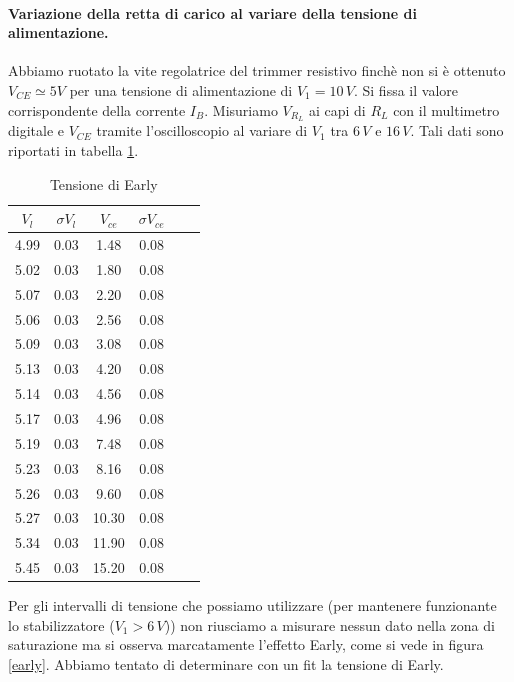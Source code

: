 \documentclass[10pt,a4paper]{article}
\begin{document}
\paragraph{Variazione della retta di carico al variare della tensione di alimentazione.}
 
Abbiamo ruotato la vite regolatrice del trimmer resistivo finchè non si è ottenuto $V_{CE}\simeq 5V$ per una tensione di alimentazione di $V_1 = 10 \, V$. Si fissa il valore corrispondente della corrente $I_B$. Misuriamo  $V_{R_L}$ ai capi di $R_L$ con il multimetro digitale  e $V_{CE}$ tramite l'oscilloscopio al variare di $V_1$ tra $6\,V$ e $16\,V$. Tali dati sono riportati in tabella \ref{dati2}.

\begin{table}[!htb]\centering
\begin{tabular}{|c|c|c|c|c|c|}
\hline
$V_l$ & $\sigma V_l$ & $V_{ce}$ & $\sigma V_{ce}$\\
\hline
4.99 & 0.03 & 1.48 & 0.08\\
5.02 & 0.03 & 1.80 & 0.08\\
5.07 & 0.03 & 2.20 & 0.08\\
5.06 & 0.03 & 2.56 & 0.08\\
5.09 & 0.03 & 3.08 & 0.08\\
5.13 & 0.03 & 4.20 & 0.08\\
5.14 & 0.03 & 4.56 & 0.08\\
5.17 & 0.03 & 4.96 & 0.08\\
5.19 & 0.03 & 7.48 & 0.08\\
5.23 & 0.03 & 8.16 & 0.08\\
5.26 & 0.03 & 9.60 & 0.08\\
5.27 & 0.03 & 10.30 & 0.08\\
5.34 & 0.03 & 11.90 & 0.08\\
5.45 & 0.03 & 15.20 & 0.08\\
\hline
\end{tabular}
\caption{Tensione di Early}
\label{dati2}
\end{table}

Per gli intervalli di tensione che possiamo utilizzare (per mantenere funzionante lo stabilizzatore ($V_{1}  > 6 \, V$)) non riusciamo a misurare nessun dato nella zona di saturazione ma si osserva marcatamente l'effetto Early, come si vede in figura \ref{early}. Abbiamo tentato di determinare con un fit la tensione di Early.
\end{document}
